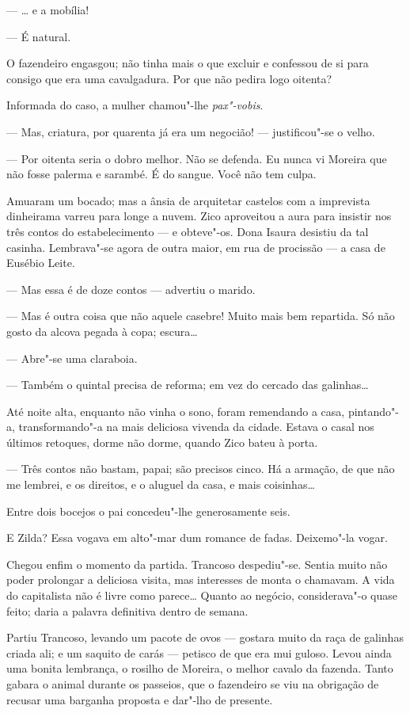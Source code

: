 --- \ldots{} e a mobília!

--- É natural.

O fazendeiro engasgou; não tinha mais o que excluir e confessou de si
para consigo que era uma cavalgadura. Por que não pedira logo oitenta?

Informada do caso, a mulher chamou"-lhe \emph{pax"-vobis}.

--- Mas, criatura, por quarenta já era um negocião! --- justificou"-se o
velho.

--- Por oitenta seria o dobro melhor. Não se defenda. Eu nunca vi
Moreira que não fosse palerma e sarambé. É do sangue. Você não tem
culpa.

Amuaram um bocado; mas a ânsia de arquitetar castelos com a imprevista
dinheirama varreu para longe a nuvem. Zico aproveitou a aura para
insistir nos três contos do estabelecimento --- e obteve"-os. Dona Isaura
desistiu da tal casinha. Lembrava"-se agora de outra maior, em rua de
procissão --- a casa de Eusébio Leite.

--- Mas essa é de doze contos --- advertiu o marido.

--- Mas é outra coisa que não aquele casebre! Muito mais bem repartida.
Só não gosto da alcova pegada à copa; escura\ldots{}

--- Abre"-se uma claraboia.

--- Também o quintal precisa de reforma; em vez do cercado das
galinhas\ldots{}

Até noite alta, enquanto não vinha o sono, foram remendando a casa,
pintando"-a, transformando"-a na mais deliciosa vivenda da cidade. Estava
o casal nos últimos retoques, dorme não dorme, quando Zico bateu à
porta.

--- Três contos não bastam, papai; são precisos cinco. Há a armação, de
que não me lembrei, e os direitos, e o aluguel da casa, e mais
coisinhas\ldots{}

Entre dois bocejos o pai concedeu"-lhe generosamente seis.

E Zilda? Essa vogava em alto"-mar dum romance de fadas. Deixemo"-la vogar.

Chegou enfim o momento da partida. Trancoso despediu"-se. Sentia muito
não poder prolongar a deliciosa visita, mas interesses de monta o
chamavam. A vida do capitalista não é livre como parece\ldots{} Quanto ao
negócio, considerava"-o quase feito; daria a palavra definitiva dentro de
semana.

Partiu Trancoso, levando um pacote de ovos --- gostara muito da raça de
galinhas criada ali; e um saquito de carás --- petisco de que era mui
guloso. Levou ainda uma bonita lembrança, o rosilho de Moreira, o melhor
cavalo da fazenda. Tanto gabara o animal durante os passeios, que o
fazendeiro se viu na obrigação de recusar uma barganha proposta e
dar"-lho de presente.

